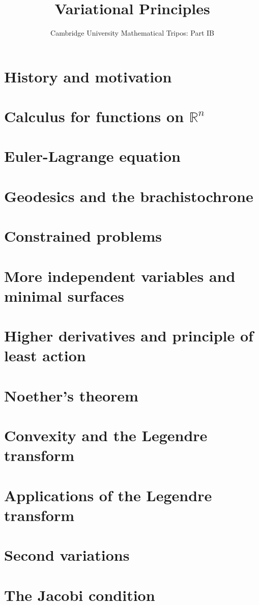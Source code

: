 \documentclass{article}
\title{Variational Principles}
\author{Cambridge University Mathematical Tripos: Part IB}
\begin{document}
\maketitle

\tableofcontentsnewpage{}

\section{History and motivation}

\section{Calculus for functions on \(\mathbb R^n\)}

\section{Euler-Lagrange equation}

\section{Geodesics and the brachistochrone}

\section{Constrained problems}

\section{More independent variables and minimal surfaces}

\section{Higher derivatives and principle of least action}

\section{Noether's theorem}

\section{Convexity and the Legendre transform}

\section{Applications of the Legendre transform}

\section{Second variations}

\section{The Jacobi condition}

\end{document}
